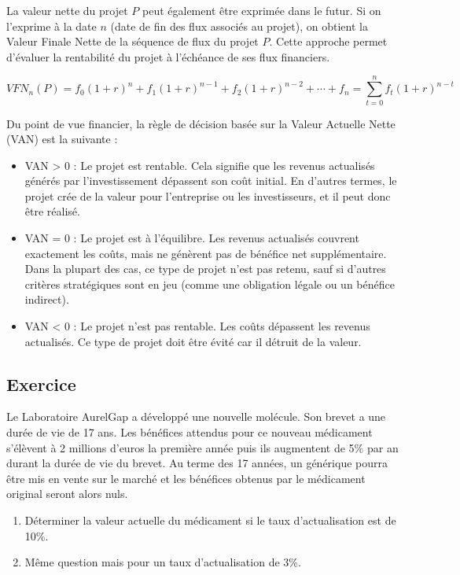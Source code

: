 \documentclass[a4paper, 12pt]{report}
\begin{document}
La valeur nette du projet \( P \) peut également être exprimée dans le futur. Si on l'exprime à la date \( n \) (date de fin des flux associés au projet), on obtient la Valeur Finale Nette de la séquence de flux du projet \( P \). Cette approche permet d'évaluer la rentabilité du projet à l'échéance de ses flux financiers.

\[ VFN_n(P)=f_0(1+r)^n+f_1(1+r)^{n-1}+f_2(1+r)^{n-2} + \cdots + f_n = \sum_{t=0}^{n}f_t(1+r)^{n-t}\]

Du point de vue financier, la règle de décision basée sur la Valeur Actuelle Nette (VAN) est la suivante :

\begin{itemize}
	\item VAN > 0 : Le projet est rentable. Cela signifie que les revenus actualisés générés par l'investissement dépassent son coût initial. En d'autres termes, le projet crée de la valeur pour l'entreprise ou les investisseurs, et il peut donc être réalisé.
	\item VAN = 0 : Le projet est à l'équilibre. Les revenus actualisés couvrent exactement les coûts, mais ne génèrent pas de bénéfice net supplémentaire. Dans la plupart des cas, ce type de projet n'est pas retenu, sauf si d'autres critères stratégiques sont en jeu (comme une obligation légale ou un bénéfice indirect).
	\item VAN < 0 : Le projet n'est pas rentable. Les coûts dépassent les revenus actualisés. Ce type de projet doit être évité car il détruit de la valeur.
\end{itemize}


\subsection{Exercice}

Le Laboratoire AurelGap a développé une nouvelle molécule. Son brevet a une durée de vie de 17 ans. Les bénéfices attendus pour ce nouveau médicament s'élèvent à 2 millions d'euros la première année puis ils augmentent de 5\% par an durant la durée de vie du brevet. Au terme des 17 années, un générique pourra être mis en vente sur le marché et les bénéfices obtenus par le médicament original seront alors nuls.

\begin{enumerate}
	\item Déterminer la valeur actuelle du médicament si le taux d'actualisation est de 10\%.
	\item Même question mais pour un taux d'actualisation de 3\%.
\end{enumerate}
\end{document}
